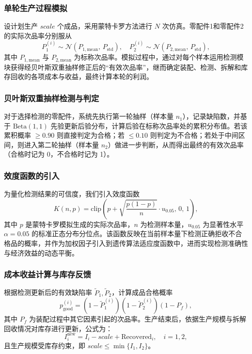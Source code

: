 \documentclass{article}
\begin{document}
	\subsubsection*{单轮生产过程模拟}  
	设计划生产 $scale$ 个成品，采用蒙特卡罗方法进行 $N$ 次仿真。零配件1和零配件2的实际次品率分别服从  
	\[
	P_1^{(i)} \sim \mathcal{N}(P_{1,\text{mean}},\,P_{\text{std}}),\quad
	P_2^{(i)} \sim \mathcal{N}(P_{2,\text{mean}},\,P_{\text{std}}),
	\]
	其中 $P_{1,\text{mean}}$ 与 $P_{2,\text{mean}}$ 为标称次品率。模拟过程中，通过对每个样本运用检测模块获得经贝叶斯双重抽样修正后的“有效次品率”，继而确定装配、检测、拆解和库存回收的各项成本与收益，最终计算本轮的利润。
	
	\subsubsection*{贝叶斯双重抽样检测与判定}  
	对于选择检测的零配件，系统先执行第一轮抽样（样本量 $n_1$），记录缺陷数，并基于 $\text{Beta}(1,1)$ 先验更新后验分布，计算后验在标称次品率处的累积分布值。若该累积概率 $\geq 0.90$ 则直接判定为合格；若 $\leq 0.10$ 则判定为不合格；若处于中间区间，则进入第二轮抽样（样本量 $n_2$）做进一步判断，从而得出最终的有效次品率（合格时记为 0，不合格时记为 1）。
	
	\subsubsection*{效度函数的引入}  
	为量化检测结果的可信度，我们引入效度函数
	\[
	K(n, p) = \text{clip}\left( p + \sqrt{\frac{p(1-p)}{n}} \cdot u_{0.05}, \, 0,\, 1 \right),
	\]
	其中 $p$ 是蒙特卡罗模拟生成的实际次品率，$n$ 为检测样本量，$u_{0.05}$ 为显著性水平 $\alpha=0.05$ 的标准正态分布分位点。该函数反映在当前样本量下检测正确拒收不合格品的概率，并作为加权因子引入到遗传算法适应度函数中，进而实现检测准确性与经济效益的动态平衡。
	
	\subsubsection*{成本收益计算与库存反馈}  
	根据检测更新后的有效缺陷率 $\tilde{P}_1,\tilde{P}_2$，计算成品合格概率
	\[
	p_{\text{good}}^{(i)} = (1-\tilde{P}_1^{(i)})(1-\tilde{P}_2^{(i)})(1-P_f),
	\]
	其中 $P_f$ 为装配过程中其它因素引起的次品率。生产结束后，依据生产规模与拆解回收情况对库存进行更新，公式为：
	\[
	I_i^{\text{new}} = I_i - scale + \text{Recovered}_i,\quad i=1,2,
	\]
	且生产规模受库存约束，即 $scale \le \min\{I_1, I_2\}$。
	
\end{document}
